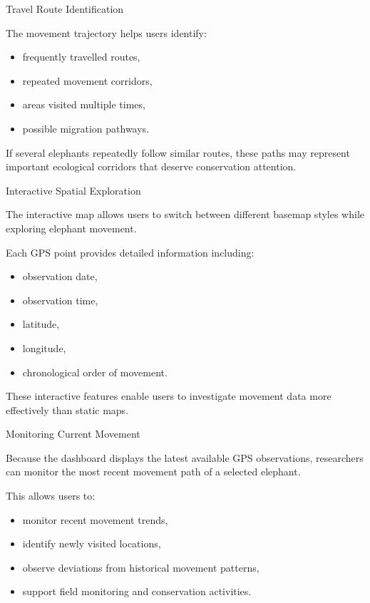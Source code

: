 \documentclass{beamer}
\begin{document}
	
		\begin{frame}{Travel Route Identification}
		
		The movement trajectory helps users identify:
		
		\begin{itemize}
			\item frequently travelled routes,
			\item repeated movement corridors,
			\item areas visited multiple times,
			\item possible migration pathways.
		\end{itemize}
		
		If several elephants repeatedly follow similar routes, these paths may represent important ecological corridors that deserve conservation attention.
		
	\end{frame}	
	
	
	
	
	
	\begin{frame}{Interactive Spatial Exploration}
		
		The interactive map allows users to switch between different basemap styles while exploring elephant movement.
		
		Each GPS point provides detailed information including:
		
		\begin{itemize}
			\item observation date,
			\item observation time,
			\item latitude,
			\item longitude,
			\item chronological order of movement.
		\end{itemize}
		
		These interactive features enable users to investigate movement data more effectively than static maps.
	\end{frame}
	
	
	
	
	
	\begin{frame}{Monitoring Current Movement}
		
		Because the dashboard displays the latest available GPS observations, researchers can monitor the most recent movement path of a selected elephant.
		
		This allows users to:
		
		\begin{itemize}
			\item monitor recent movement trends,
			\item identify newly visited locations,
			\item observe deviations from historical movement patterns,
			\item support field monitoring and conservation activities.
		\end{itemize}
	\end{frame}
	
\end{document}
